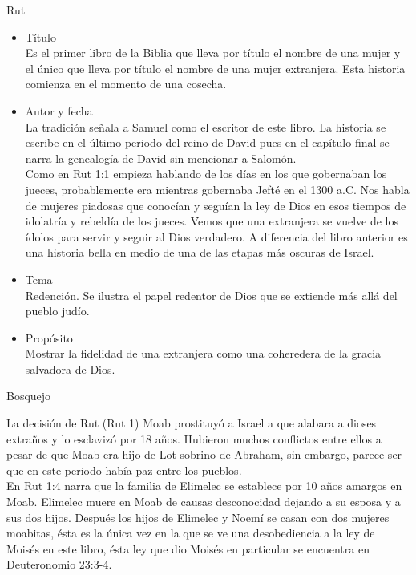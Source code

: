 %
%
\begin{section}{Rut}
	\begin{itemize}
		\item Título\\
			Es el primer libro de la Biblia que lleva por título el nombre de una mujer y el único que lleva por título el nombre de una mujer extranjera. Esta historia comienza en el momento de una cosecha.
		\item Autor y fecha\\
			La tradición señala a Samuel como el escritor de este libro. La historia se escribe en el último periodo del reino de David pues en el capítulo final se narra la genealogía de David sin mencionar a Salomón.\\
			Como en Rut 1:1 empieza hablando de los días en los que gobernaban los jueces, probablemente era mientras gobernaba Jefté en el 1300 a.C. Nos habla de mujeres piadosas que conocían y seguían la ley de Dios en esos tiempos de idolatría y rebeldía de los jueces. Vemos que una extranjera se vuelve de los ídolos para servir y seguir al Dios verdadero. A diferencia del libro anterior es una historia bella en medio de una de las etapas más oscuras de Israel.
		\item Tema\\
			Redención. Se ilustra el papel redentor de Dios que se extiende más allá del pueblo judío.
		\item Propósito\\
			Mostrar la fidelidad de una extranjera como una coheredera de la gracia salvadora de Dios.
	\end{itemize}
	\begin{subsection}{Bosquejo}
		\begin{subsubsection}{La decisión de Rut (Rut 1)} 
Moab prostituyó a Israel a que alabara a dioses extraños y lo esclavizó por 18 años. Hubieron muchos conflictos entre ellos a pesar de que Moab era hijo de Lot sobrino de Abraham, sin embargo, parece ser que en este periodo había paz entre los pueblos.\\
En Rut 1:4 narra que la familia de Elimelec se establece por 10 años amargos en Moab. Elimelec muere en Moab de causas desconocidad dejando a su esposa y a sus dos hijos. Después los hijos de Elimelec y Noemí se casan con dos mujeres moabitas, ésta es la única vez en la que se ve una desobediencia a la ley de Moisés en este libro, ésta ley que dio Moisés en particular se encuentra en Deuteronomio 23:3-4.\\

\end{subsubsection}
\end{subsection}
\end{section}
